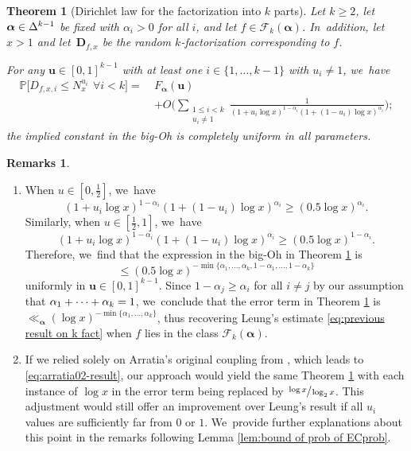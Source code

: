 \documentclass[JEP,XML,SOM,Unicode,published]{cedram}
\newenvironment{enumeratea}
{\bgroup\def\theenumi{\alph{enumi}}\begin{enumerate}}
{\end{enumerate}\egroup}
\newcommand{\bu}{{\boldsymbol u}}
\newcommand{\bD}{{\boldsymbol D}}
\newcommand{\PP}{\mathbb{P}}
\newcommand{\boldalpha}{\boldsymbol{\alpha}}
\newcommand{\simplex}{\Delta^{k-1}}
\newcommand{\bg}{\big}
\newcommand{\bggg}{\bigg}
\theoremstyle{plain}
\newtheorem{theo}{Theorem}
\theoremstyle{definition}
\newtheorem*{remss}{Remarks}
\begin{document}
\begin{theo}[Dirichlet law for the factorization into $k$ parts]
\label{thm:fact into k parts}
Let $k \ge 2$, let $\boldalpha \in\nobreak \simplex$ be fixed with $\alpha_i > 0$ for all $i$, and let $f\in\mathcal{F}_k(\boldalpha)$. In~addition, let $x>1$ and let~$\bD_{f, x}$ be the random $k$-factorization corresponding to $f$.

For any $\bu \in [0, 1]^{k-1}$ with at least one $i \in \{1, \ldots, k-1\}$ with $u_i \ne 1$, we~have
\begin{align*}
\PP\bg[D_{f, x,i} \le N_x^{u_i}\ \, \forall i < k\bg] =\ &F_{\boldalpha}(\bu)\\
&+ O\bggg(\sum_{\substack{1 \le i < k \\ u_i \ne 1}} \frac{1}{(1+u_i\log x)^{1-\alpha_i}(1+(1-u_i)\log x)^{\alpha_i}}\bggg);
\end{align*}
the implied constant in the big-Oh is completely uniform in all parameters.
\end{theo}

\skpt\begin{remss}
\begin{enumeratea}
\item
When $u\in[0,\frac{1}{2}]$, we~have
\[
(1+u_i\log x)^{1-\alpha_i}(1+(1-u_i)\log x)^{\alpha_i}\ge (0.5\log x)^{\alpha_i}.
\]
Similarly, when $u\in[\frac{1}{2},1]$, we~have
\[
(1+u_i\log x)^{1-\alpha_i}(1+(1-u_i)\log x)^{\alpha_i}\ge (0.5\log x)^{1-\alpha_i}.
\]
Therefore, we~find that the expression in the big-Oh in Theorem \ref{thm:fact into k parts} is
\[
\le (0.5\log x)^{-\min\{\alpha_1,\dots,\alpha_k,1-\alpha_1,\dots,1-\alpha_k\} }
\]
uniformly in $\bu\in[0,1]^{k-1}$. Since $1-\alpha_j\ge\alpha_i$ for all $i\neq j$ by our assumption that $\alpha_1+\nobreak\cdots+\alpha_k=1$, we~conclude that the error term in Theorem \ref{thm:fact into k parts} is \hbox{$\ll_{\boldalpha} (\log x)^{-\min\{\alpha_1,\dots,\alpha_k\}}$}, thus recovering Leung's estimate \eqref{eq:previous result on k fact} when $f$ lies in the class $\mathcal{F}_k(\boldalpha)$.

\item
If we relied solely on Arratia's original coupling from \cite{Arratia02}, which leads to \eqref{eq:arratia02-result}, our approach would yield the same Theorem \ref{thm:fact into k parts} with each instance of $\log x$ in the error term being replaced by $\sfrac{\log x}{\log_2 x}$. This adjustment would still offer an improvement over Leung's result if all $u_i$ values are sufficiently far from $0$ or $1$. We~provide further explanations about this point in the remarks following Lemma \ref{lem:bound of prob of ECprob}.
\end{enumeratea}
\end{remss}
\end{document}
